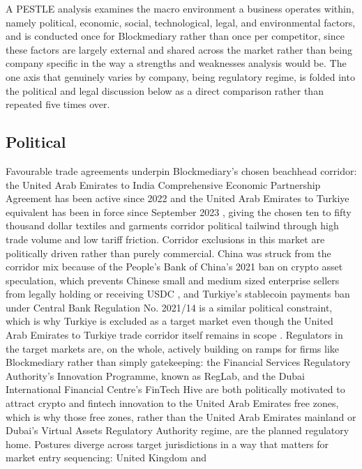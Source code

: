 \documentclass[12pt, a4paper]{article}
\begin{document}
A PESTLE analysis examines the macro environment a business operates within, namely
political, economic, social, technological, legal, and environmental factors, and is
conducted once for Blockmediary rather than once per competitor, since these factors are
largely external and shared across the market rather than being company specific in the
way a strengths and weaknesses analysis would be. The one axis that genuinely varies by
company, being regulatory regime, is folded into the political and legal discussion below
as a direct comparison rather than repeated five times over.

\subsection*{Political}

Favourable trade agreements underpin Blockmediary's chosen beachhead corridor: the United
Arab Emirates to India Comprehensive Economic Partnership Agreement has been active since
2022 and the United Arab Emirates to Turkiye equivalent has been in force since September
2023 \citep{uaeindiacepa2022, uaeturkiyecepa2023}, giving the chosen ten to fifty thousand
dollar textiles and garments corridor political tailwind through high trade volume and low
tariff friction. Corridor exclusions in this market are politically driven rather than
purely commercial. China was struck from the corridor mix because of the People's Bank of
China's 2021 ban on crypto asset speculation, which prevents Chinese small and medium
sized enterprise sellers from legally holding or receiving USDC \citep{pbocban2021}, and
Turkiye's stablecoin payments ban under Central Bank Regulation No. 2021/14 is a similar
political constraint, which is why Turkiye is excluded as a target market even though the
United Arab Emirates to Turkiye trade corridor itself remains in scope
\citep{cbrt202114}. Regulators in the target markets are, on the whole, actively building
on ramps for firms like Blockmediary rather than simply gatekeeping: the Financial
Services Regulatory Authority's Innovation Programme, known as RegLab, and the Dubai
International Financial Centre's FinTech Hive are both politically motivated to attract
crypto and fintech innovation to the United Arab Emirates free zones, which is why those
free zones, rather than the United Arab Emirates mainland or Dubai's Virtual Assets
Regulatory Authority regime, are the planned regulatory home. Postures diverge across
target jurisdictions in a way that matters for market entry sequencing: United Kingdom and
\end{document}
